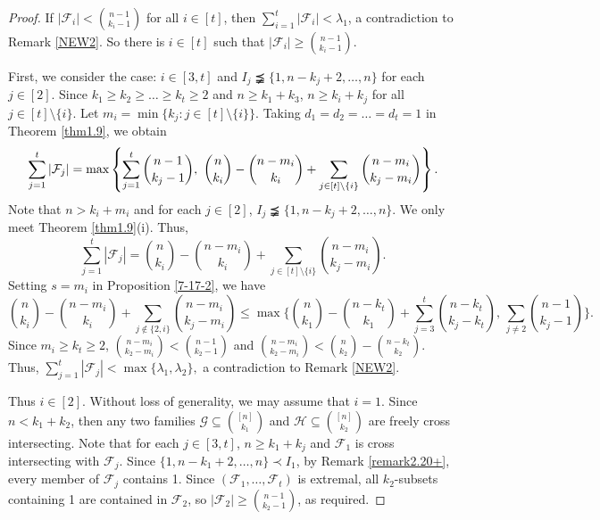 \documentclass[a4paper,11pt]{article}
\begin{document}
\begin{proof}
  If  $|\mathcal{F}_i|< {n-1\choose k_i-1}$ for all $i\in [t]$, then $\sum_{i=1}^t{|\mathcal{F}_i|}< \lambda_1$, a contradiction to Remark \ref{NEW2}. So there is $i\in [t]$ such that $|\mathcal{F}_i|\geq {n-1\choose k_i-1}$.



First, we consider the case: $i\in [3, t]$ and  $I_j\precneqq \{1, n-k_j+2, \dots, n\}$ for each $j\in [2]$.
Since  $k_1\geq k_2\geq\dots\geq k_t\geq 2$ and $n\geq k_1+k_3$,   $n\geq k_i+k_j$ for all $j\in [t]\setminus \{i\}$.
Let $m_i=\min \{k_j: j\in [t]\setminus \{i\}\}$.
Taking $d_1=d_2=\dots=d_t=1$ in Theorem \ref{thm1.9}, we obtain
\[
\sum_{j=1}^t|\mathcal{F}_j|
 = \textup{max}\left\{ \sum_{j=1}^t{n-1\choose k_j-1}, \,\,{n\choose k_i}-{n-m_i \choose k_i}+\sum_{j\in [t]\setminus \{i\}}{n-m_i\choose k_j-m_i}  \right\}.
 \]
 Note that $n>k_i+m_i$ and  for each $j\in [2]$, $I_j\precneqq \{1, n-k_j+2, \dots, n\}$. We only meet Theorem \ref{thm1.9}(i). Thus,
\[
\sum_{j=1}^t|\mathcal{F}_j|
= {n\choose k_i}-{n-m_i \choose k_i}+\sum_{j\in [t]\setminus \{i\}}{n-m_i\choose k_j-m_i}.
\]
 Setting $s=m_i$ in Proposition \ref{7-17-2}, we have
\begin{equation*}
{n\choose k_i} \!- \! {n\!-\!m_i \choose k_i}+ \! \! \sum_{j\not\in \{2, i\}} \!\!\!
{n\!-\!m_i\choose k_j \!-\!m_i}\leq
\max\Bigg\{
{n\choose k_1} \!-\! {n\!-\!k_t\choose k_1}
\!+ \!
\sum_{j=3}^t{n\!-\!k_t\choose k_j\!-\!k_t}, \,
\sum_{j\ne2}{n\!-\!1\choose k_j \!-\! 1}
\Bigg\}.
\end{equation*}
Since $m_i\geq k_t\geq 2$,
$
{n-m_i\choose k_2-m_i}<{n-1\choose k_2-1}$ and
${n-m_i\choose k_2-m_i}<{n\choose k_2}-{n-k_t\choose k_2}$.
Thus,
 $
 \sum_{j=1}^t|\mathcal{F}_j|<\max \{\lambda_1, \lambda_2\},
$
 a contradiction to Remark \ref{NEW2}.

Thus $i\in [2]$.
 Without loss of generality, we may assume that $i=1$. Since $n<k_1+k_2$, then  any two families  $\mathcal{G}\subseteq {[n]\choose k_1}$ and  $\mathcal{H}\subseteq{[n]\choose k_2}$ are freely cross intersecting. Note that  for each $j\in [3, t]$, $n\geq k_1+k_j$ and $\mathcal{F}_1$ is cross intersecting with $\mathcal{F}_j$.
 Since $\{1, n-k_1+2, \dots, n\}\prec I_1$, by Remark \ref{remark2.20+},  every member of $\mathcal{F}_j$ contains 1. Since $(\mathcal{F}_1, \dots, \mathcal{F}_t)$ is extremal,
 all $k_2$-subsets containing 1 are contained in $\mathcal{F}_2$, so  $|\mathcal{F}_2|\geq {n-1\choose k_2-1}$, as required.
\end{proof}
\end{document}
